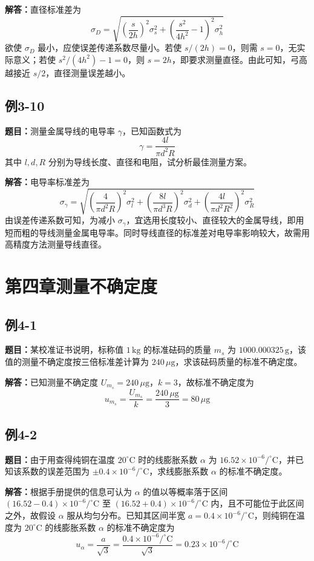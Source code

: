 \documentclass[UTF8,zihao=-4]{ctexart}
\newcommand{\problem}[1]{\subsection*{#1}}
\newcommand{\timu}{\noindent\textbf{题目：}}
\newcommand{\jieda}{\noindent\textbf{解答：}}
\begin{document}
\jieda 直径标准差为
\begin{equation*}
    \sigma_D=\sqrt{\left(\frac{s}{2h}\right)^2\sigma_s^2+
    \left(\frac{s^2}{4h^2}-1\right)^2\sigma_h^2}
\end{equation*}
欲使 $\sigma_D$ 最小，应使误差传递系数尽量小。若使 $s/(2h)=0$，则需 $s=0$，无实际意义；若使 $s^2/(4h^2)-1=0$，则 $s=2h$，即要求测量直径。由此可知，弓高越接近 $s/2$，直径测量误差越小。

\problem{例3-10}
\timu 测量金属导线的电导率 $\gamma$，已知函数式为
\begin{equation*}
    \gamma=\frac{4l}{\pi d^2R}
\end{equation*}
其中 $l,d,R$ 分别为导线长度、直径和电阻，试分析最佳测量方案。

\jieda 电导率标准差为
\begin{equation*}
    \sigma_{\gamma}=\sqrt{
    \left(\frac{4}{\pi d^2R}\right)^2\sigma_l^2+
    \left(\frac{8l}{\pi d^3R}\right)^2\sigma_d^2+
    \left(\frac{4l}{\pi d^2R^2}\right)^2\sigma_R^2}
\end{equation*}
由误差传递系数可知，为减小 $\sigma_{\gamma}$，宜选用长度较小、直径较大的金属导线，即用短而粗的导线测量金属电导率。同时导线直径的标准差对电导率影响较大，故需用高精度方法测量导线直径。

\section*{第四章\quad 测量不确定度}

\problem{例4-1}

\timu 某校准证书说明，标称值 $1\,\mathrm{kg}$ 的标准砝码的质量 $m_s$ 为 $1000.000325\,\mathrm{g}$，该值的测量不确定度按三倍标准差计算为 $240\,\mu\mathrm{g}$，求该砝码质量的标准不确定度。

\jieda 已知测量不确定度 $U_{m_s}=240\,\mu\mathrm{g}$，$k=3$，故标准不确定度为
\begin{equation*}
    u_{m_s}
    =
    \frac{U_{m_s}}{k}
    =
    \frac{240\,\mu\mathrm{g}}{3}
    =
    80\,\mu\mathrm{g}
\end{equation*}

\problem{例4-2}

\timu 由于用查得纯铜在温度 $20^\circ\mathrm{C}$ 时的线膨胀系数 $\alpha$ 为 $16.52\times10^{-6}/^\circ\mathrm{C}$，并已知该系数的误差范围为 $\pm0.4\times10^{-6}/^\circ\mathrm{C}$，求线膨胀系数 $\alpha$ 的标准不确定度。

\jieda 根据手册提供的信息可认为 $\alpha$ 的值以等概率落于区间 $(16.52-0.4)\times10^{-6}/^\circ\mathrm{C}$ 至 $(16.52+0.4)\times10^{-6}/^\circ\mathrm{C}$ 内，且不可能位于此区间之外，故假设 $\alpha$ 服从均匀分布。已知其区间半宽 $a=0.4\times10^{-6}/^\circ\mathrm{C}$，则纯铜在温度为 $20^\circ\mathrm{C}$ 的线膨胀系数 $\alpha$ 的标准不确定度为
\begin{equation*}
    u_{\alpha}
    =
    \frac{a}{\sqrt{3}}
    =
    \frac{0.4\times10^{-6}/^\circ\mathrm{C}}{\sqrt{3}}
    =
    0.23\times10^{-6}/^\circ\mathrm{C}
\end{equation*}
\end{document}
